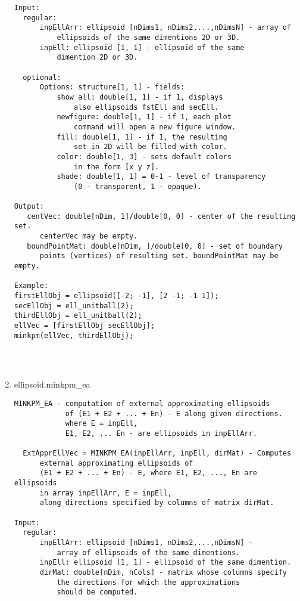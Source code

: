 \begin{enumerate}
\begin{lstlisting}
Input:
  regular:
      inpEllArr: ellipsoid [nDims1, nDims2,...,nDimsN] - array of
          ellipsoids of the same dimentions 2D or 3D.
      inpEll: ellipsoid [1, 1] - ellipsoid of the same
          dimention 2D or 3D.

  optional:
      Options: structure[1, 1] - fields:
          show_all: double[1, 1] - if 1, displays
              also ellipsoids fstEll and secEll.
          newfigure: double[1, 1] - if 1, each plot
              command will open a new figure window.
          fill: double[1, 1] - if 1, the resulting
              set in 2D will be filled with color.
          color: double[1, 3] - sets default colors
              in the form [x y z].
          shade: double[1, 1] = 0-1 - level of transparency
              (0 - transparent, 1 - opaque).

Output:
   centVec: double[nDim, 1]/double[0, 0] - center of the resulting set.
      centerVec may be empty.
   boundPointMat: double[nDim, ]/double[0, 0] - set of boundary
      points (vertices) of resulting set. boundPointMat may be empty.

Example:
firstEllObj = ellipsoid([-2; -1], [2 -1; -1 1]);
secEllObj = ell_unitball(2);
thirdEllObj = ell_unitball(2);
ellVec = [firstEllObj secEllObj];
minkpm(ellVec, thirdEllObj);




\end{lstlisting}
\fontfamily{\familydefault}
\selectfont
\item {ellipsoid.minkpm\_ea}
\selectfont
\begin{lstlisting}
MINKPM_EA - computation of external approximating ellipsoids
            of (E1 + E2 + ... + En) - E along given directions.
            where E = inpEll,
            E1, E2, ... En - are ellipsoids in inpEllArr.

  ExtApprEllVec = MINKPM_EA(inpEllArr, inpEll, dirMat) - Computes
      external approximating ellipsoids of
      (E1 + E2 + ... + En) - E, where E1, E2, ..., En are ellipsoids
      in array inpEllArr, E = inpEll,
      along directions specified by columns of matrix dirMat.

Input:
  regular:
      inpEllArr: ellipsoid [nDims1, nDims2,...,nDimsN] -
          array of ellipsoids of the same dimentions.
      inpEll: ellipsoid [1, 1] - ellipsoid of the same dimention.
      dirMat: double[nDim, nCols] - matrix whose columns specify
          the directions for which the approximations
          should be computed.


\end{lstlisting}
\end{enumerate}
